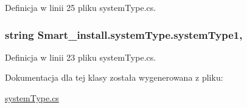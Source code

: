 Definicja w linii 25 pliku system\+Type.\+cs.

\hypertarget{class_smart__install_1_1system_type_ae3ceae4fd9a795c8305c83f10745ae8a}{
\subsubsection[{system\+Type1}]{\setlength{\rightskip}{0pt plus 5cm}string Smart\+\_\+install.\+system\+Type.\+system\+Type1\hspace{0.3cm}{\ttfamily [get]}, {\ttfamily [set]}}}\label{class_smart__install_1_1system_type_ae3ceae4fd9a795c8305c83f10745ae8a}


Definicja w linii 23 pliku system\+Type.\+cs.



Dokumentacja dla tej klasy została wygenerowana z pliku\+:\begin{DoxyCompactItemize}
\item 
\hyperlink{system_type_8cs}{system\+Type.\+cs}\end{DoxyCompactItemize}
